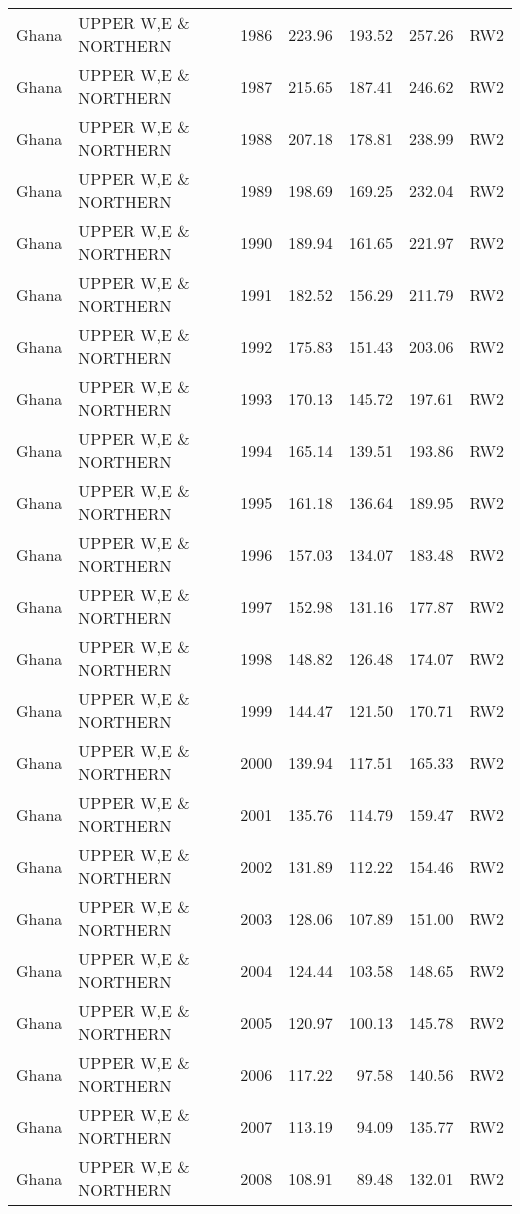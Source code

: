 \begin{longtable}{lllrrrl}
  Ghana & UPPER W,E \& NORTHERN & 1986 & 223.96 & 193.52 & 257.26 & RW2 \\ 
  Ghana & UPPER W,E \& NORTHERN & 1987 & 215.65 & 187.41 & 246.62 & RW2 \\ 
  Ghana & UPPER W,E \& NORTHERN & 1988 & 207.18 & 178.81 & 238.99 & RW2 \\ 
  Ghana & UPPER W,E \& NORTHERN & 1989 & 198.69 & 169.25 & 232.04 & RW2 \\ 
  Ghana & UPPER W,E \& NORTHERN & 1990 & 189.94 & 161.65 & 221.97 & RW2 \\ 
  Ghana & UPPER W,E \& NORTHERN & 1991 & 182.52 & 156.29 & 211.79 & RW2 \\ 
  Ghana & UPPER W,E \& NORTHERN & 1992 & 175.83 & 151.43 & 203.06 & RW2 \\ 
  Ghana & UPPER W,E \& NORTHERN & 1993 & 170.13 & 145.72 & 197.61 & RW2 \\ 
  Ghana & UPPER W,E \& NORTHERN & 1994 & 165.14 & 139.51 & 193.86 & RW2 \\ 
  Ghana & UPPER W,E \& NORTHERN & 1995 & 161.18 & 136.64 & 189.95 & RW2 \\ 
  Ghana & UPPER W,E \& NORTHERN & 1996 & 157.03 & 134.07 & 183.48 & RW2 \\ 
  Ghana & UPPER W,E \& NORTHERN & 1997 & 152.98 & 131.16 & 177.87 & RW2 \\ 
  Ghana & UPPER W,E \& NORTHERN & 1998 & 148.82 & 126.48 & 174.07 & RW2 \\ 
  Ghana & UPPER W,E \& NORTHERN & 1999 & 144.47 & 121.50 & 170.71 & RW2 \\ 
  Ghana & UPPER W,E \& NORTHERN & 2000 & 139.94 & 117.51 & 165.33 & RW2 \\ 
  Ghana & UPPER W,E \& NORTHERN & 2001 & 135.76 & 114.79 & 159.47 & RW2 \\ 
  Ghana & UPPER W,E \& NORTHERN & 2002 & 131.89 & 112.22 & 154.46 & RW2 \\ 
  Ghana & UPPER W,E \& NORTHERN & 2003 & 128.06 & 107.89 & 151.00 & RW2 \\ 
  Ghana & UPPER W,E \& NORTHERN & 2004 & 124.44 & 103.58 & 148.65 & RW2 \\ 
  Ghana & UPPER W,E \& NORTHERN & 2005 & 120.97 & 100.13 & 145.78 & RW2 \\ 
  Ghana & UPPER W,E \& NORTHERN & 2006 & 117.22 & 97.58 & 140.56 & RW2 \\ 
  Ghana & UPPER W,E \& NORTHERN & 2007 & 113.19 & 94.09 & 135.77 & RW2 \\ 
  Ghana & UPPER W,E \& NORTHERN & 2008 & 108.91 & 89.48 & 132.01 & RW2 \\ 

\end{longtable}
